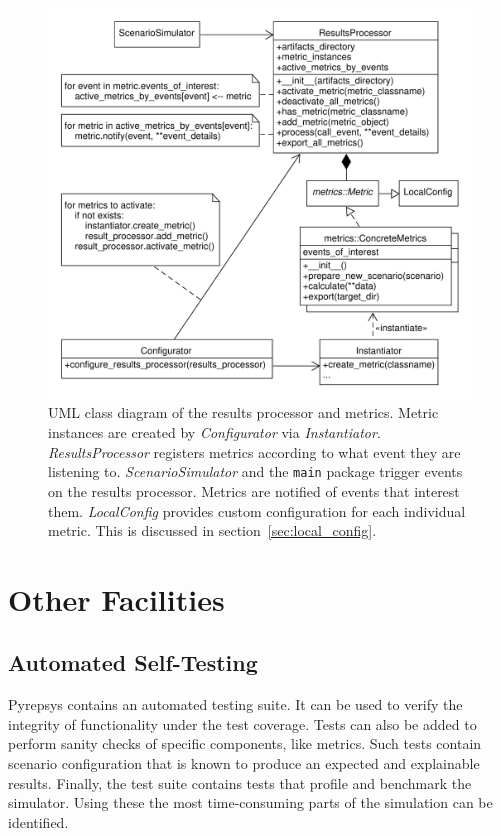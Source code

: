 \documentclass[%
    ]{\PathToTumTemplate/thesis/tum_thesis}
\begin{document}
\begin{figure}[tbp]
  \begin{center}
        \includegraphics[width=1\linewidth]	{../uml/reproc_metrics.pdf}
    \caption{
	UML class diagram of the results processor and metrics.
	Metric instances are created by \emph{Configurator} via \emph{Instantiator}.
	\emph{ResultsProcessor} registers metrics according to what event they are listening to.
	\emph{ScenarioSimulator} and the \lstinline{main} package trigger events on the results processor.
	Metrics are notified of events that interest them.
	\emph{LocalConfig} provides custom configuration for each individual metric.
	This is discussed in section~\ref{sec:local_config}.
    }
    \label{fig:reproc_metrics}
  \end{center}
\end{figure}



\section{Other Facilities}\label{sec:impl_misc}

\subsection{Automated Self-Testing}
Pyrepsys contains an automated testing suite.
It can be used to verify the integrity of functionality under the test coverage.
Tests can also be added to perform sanity checks of specific components, like metrics.
Such tests contain scenario configuration that is known to produce an expected and explainable results.
Finally, the test suite contains tests that profile and benchmark the simulator.
Using these the most time-consuming parts of the simulation can be identified.
\end{document}

